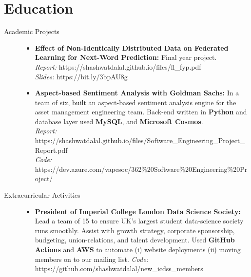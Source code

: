 \documentclass[a4paper]{deedy-resume} %
\begin{document}
\section{Education}
    \begin{description}
        \item[Academic Projects] \hspace{7.5cm}
            \begin{itemize}
                \item \textbf{Effect of Non-Identically Distributed Data on Federated Learning for Next-Word Prediction:} Final year project. \\
                \textit{Report: } https://shashwatdalal.github.io/files/fl\_fyp.pdf \\
                \textit{Slides: } https://bit.ly/3bpAU8g
                \item \textbf{Aspect-based Sentiment Analysis with Goldman Sachs:} In a team of six, built an aspect-based sentiment analysis engine for the asset management engineering team. Back-end written in \textbf{Python} and database layer used \textbf{MySQL}, and \textbf{Microsoft Cosmos}. \\
                \textit{Report:} https://shashwatdalal.github.io/files/Software\_Engineering\_Project\_Report.pdf \\ \textit{Code:} https://dev.azure.com/vapesoc/362\%20Software\%20Engineering\%20Project/
        \end{itemize}
         \item[Extracurricular Activities] \hspace{7.5cm}
            \begin{itemize}
                \item \textbf{President of Imperial College London Data Science Society:} Lead a team of 15 to ensure UK's largest student data-science society runs smoothly. Assist with growth strategy, corporate sponsorship, budgeting, union-relations, and talent development. Used \textbf{GitHub Actions} and \textbf{AWS} to automate (i) website deployments (ii) moving members on to our mailing list.
                \textit{Code:} https://github.com/shashwatdalal/new\_icdss\_members
        \end{itemize}
    \end{description}
\end{document}
